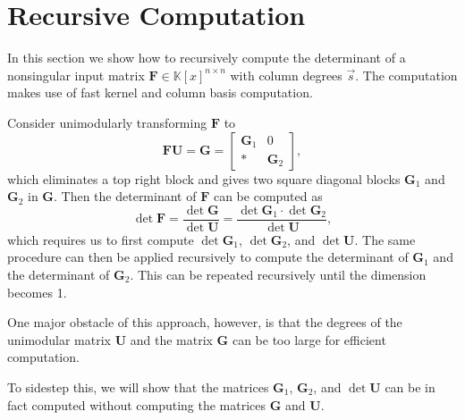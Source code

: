 
\section{\label{sec:diagonals}Recursive Computation}

In this section we show how to recursively compute the determinant
of a nonsingular input matrix $\mathbf{F}\in\mathbb{K}\left[x\right]^{n\times n}$
with column degrees $\vec{s}$. The computation makes use of fast
kernel and column basis computation.

Consider unimodularly transforming $\mathbf{F}$ to 
\begin{equation}
\mathbf{F}\mathbf{U}=\mathbf{G}=\begin{bmatrix}\mathbf{G}_{1} & 0\\
* & \mathbf{G}_{2}
\end{bmatrix},\label{eq:step1HermiteDiagonal}
\end{equation}
which eliminates a top right block and gives two square diagonal blocks
$\mathbf{G}_{1}$ and\textbf{ $\mathbf{G}_{2}$} in $\mathbf{G}$.
Then the determinant of $\mathbf{F}$ can be computed as 
\begin{equation}
\det\mathbf{F}=\frac{\det\mathbf{G}}{\det\mathbf{U}}=\frac{\det\mathbf{G}_{1}\cdot\det\mathbf{G}_{2}}{\det\mathbf{U}},\label{eq:determinantFromDiagonalBlocks}
\end{equation}
 which requires us to first compute $\det\mathbf{G}_{1}$, $\det\mathbf{G}_{2}$,
and $\det\mathbf{U}$. The same procedure can then be applied recursively
to compute the determinant of $\mathbf{G}_{1}$ and the determinant
of $\mathbf{G}_{2}$. This can be repeated recursively until the dimension
becomes 1. 

One major obstacle of this approach, however, is that the degrees
of the unimodular matrix $\mathbf{U}$ and the matrix $\mathbf{G}$
can be too large for efficient computation. %
\begin{comment}
To construct such an example, just use a random $k\times\left(k+1\right)$
matrix $\mathbf{A}$, and set $\mathbf{F}=\begin{bmatrix}\mathbf{A} & 0\\
* & *
\end{bmatrix}$, and compute $\mathbf{G}_{1}$ as a column basis of $\mathbf{A}$.
Then the degrees of $\mathbf{U}$ and $\mathbf{G}$ are often $\Theta(nd)$.
\end{comment}
{} To sidestep this, we will show that the matrices $\mathbf{G}_{1}$,\textbf{
$\mathbf{G}_{2}$}, and $\det\mathbf{U}$ can be in fact computed
without computing the matrices $\mathbf{G}$ and $\mathbf{U}$. 


